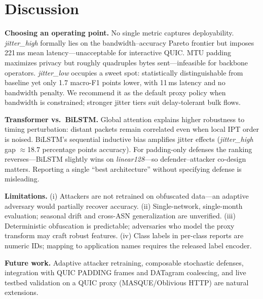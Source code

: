 \section{Discussion}
\label{sec:discussion}

\textbf{Choosing an operating point.}
No single metric captures deployability. \emph{jitter\_high} formally lies on the
bandwidth--accuracy Pareto frontier but imposes 221\,ms mean latency---unacceptable
for interactive QUIC. MTU padding maximizes privacy but roughly quadruples bytes
sent---infeasible for backbone operators. \emph{jitter\_low} occupies a sweet spot:
statistically distinguishable from baseline yet only 1.7 macro-F1 points lower, with
11\,ms latency and no bandwidth penalty. We recommend it as the default proxy policy
when bandwidth is constrained; stronger jitter tiers suit delay-tolerant bulk flows.

\textbf{Transformer vs.\ BiLSTM.}
Global attention explains higher robustness to timing perturbation: distant packets
remain correlated even when local IPT order is noised. BiLSTM's sequential inductive
bias amplifies jitter effects (\emph{jitter\_high} gap $\approx$18.7 percentage
points accuracy). For padding-only defenses the ranking reverses---BiLSTM slightly
wins on \emph{linear128}---so defender--attacker co-design matters. Reporting a single
``best architecture'' without specifying defense is misleading.

\textbf{Limitations.}
(i) Attackers are not retrained on obfuscated data---an adaptive adversary would
partially recover accuracy. (ii) Single-network, single-month evaluation; seasonal
drift and cross-ASN generalization are unverified. (iii) Deterministic obfuscation is
predictable; adversaries who model the proxy transform may craft robust features.
(iv) Class labels in per-class reports are numeric IDs; mapping to application names
requires the released label encoder.

\textbf{Future work.}
Adaptive attacker retraining, composable stochastic defenses, integration with QUIC
PADDING frames and DATagram coalescing, and live testbed validation on a QUIC proxy
(MASQUE/Oblivious HTTP) are natural extensions.

